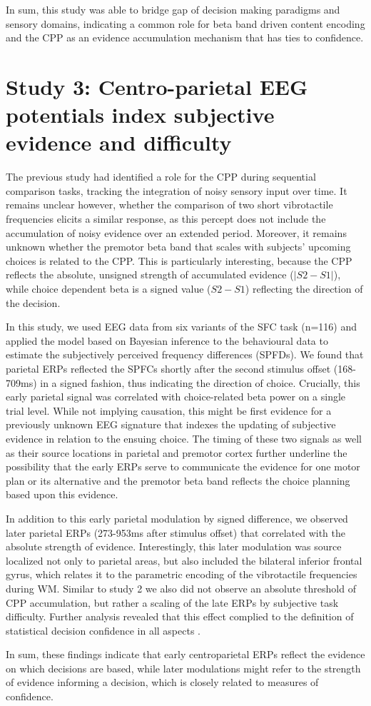 In sum, this study was able to bridge gap of decision making paradigms and sensory domains, indicating a common role for beta band driven content encoding and the CPP as an evidence accumulation mechanism that has ties to confidence.

\section{Study 3: Centro-parietal EEG potentials index subjective evidence and difficulty}
The previous study had identified a role for the CPP during sequential comparison tasks, tracking the integration of noisy sensory input over time. It remains unclear however, whether the comparison of two short vibrotactile frequencies elicits a similar response, as this percept does not include the accumulation of noisy evidence over an extended period. Moreover, it remains unknown whether the premotor beta band that scales with subjects’ upcoming choices is related to the CPP. This is particularly interesting, because the CPP reflects the absolute, unsigned strength of accumulated evidence ($|S2-S1|$), while choice dependent beta is a signed value ($S2-S1$) reflecting the direction of the decision. 

In this study, we used EEG data from six variants of the SFC task (n=116) and applied the model based on Bayesian inference to the behavioural data to estimate the subjectively perceived frequency differences (SPFDs). We found that parietal ERPs reflected the SPFCs shortly after the second stimulus offset (168-709ms) in a signed fashion, thus indicating the direction of choice. Crucially, this early parietal signal was correlated with choice-related beta power on a single trial level. While not implying causation, this might be first evidence for a previously unknown EEG signature that indexes the updating of subjective evidence in relation to the ensuing choice. The timing of these two signals as well as their source locations in parietal and premotor cortex further underline the possibility that the early ERPs serve to communicate the evidence for one motor plan or its alternative and the premotor beta band reflects the choice planning based upon this evidence.

In addition to this early parietal modulation by signed difference, we observed later parietal ERPs (273-953ms after stimulus offset) that correlated with the absolute strength of evidence. Interestingly, this later modulation was source localized not only to parietal areas, but also included the bilateral inferior frontal gyrus, which relates it to the parametric encoding of the vibrotactile frequencies during WM. Similar to study 2 we also did not observe an absolute threshold of CPP accumulation, but rather a scaling of the late ERPs by subjective task difficulty. Further analysis revealed that this effect complied to the definition of statistical decision confidence in all aspects \parencite{Hangya2016,Sanders2016}. 

In sum, these findings indicate that early centroparietal ERPs reflect the evidence on which decisions are based, while later modulations might refer to the strength of evidence informing a decision, which is closely related to measures of confidence.